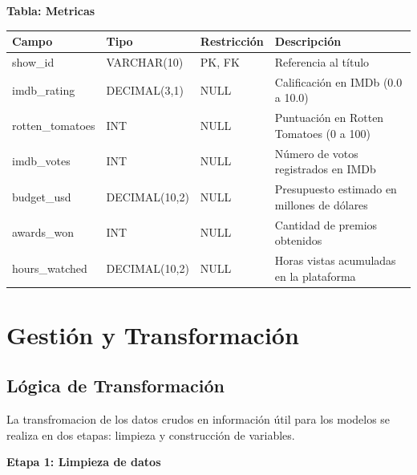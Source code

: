 \documentclass[12pt,a4paper]{article}
\begin{document}
\vspace{0.5cm}

\textbf{Tabla: Metricas}

\vspace{0.2cm}
\begin{center}
\begin{tabular}{>{\ttfamily}p{3.8cm} p{2.8cm} p{2.5cm} p{5cm}}
\toprule
\normalfont Campo & Tipo & Restricci\'on & Descripci\'on \\
\midrule
show\_id           & VARCHAR(10)   & PK, FK        & Referencia al t\'itulo \\
imdb\_rating       & DECIMAL(3,1)  & NULL          & Calificaci\'on en IMDb (0.0 a 10.0) \\
rotten\_tomatoes   & INT           & NULL          & Puntuaci\'on en Rotten Tomatoes (0 a 100) \\
imdb\_votes        & INT           & NULL          & N\'umero de votos registrados en IMDb \\
budget\_usd        & DECIMAL(10,2) & NULL          & Presupuesto estimado en millones de d\'olares \\
awards\_won        & INT           & NULL          & Cantidad de premios obtenidos \\
hours\_watched     & DECIMAL(10,2) & NULL          & Horas vistas acumuladas en la plataforma \\
\bottomrule
\end{tabular}
\end{center}

\newpage
\section*{Gesti\'on y Transformaci\'on}

\subsection*{L\'ogica de Transformaci\'on}

La transfromacion de los datos crudos en informaci\'on \'util para los modelos se realiza en dos etapas: limpieza y construcci\'on de variables. 
\vspace{0.4cm}

\textbf{Etapa 1: Limpieza de datos}
\end{document}
